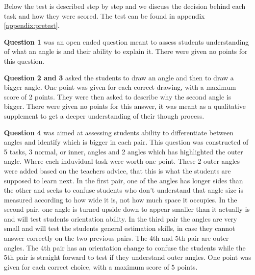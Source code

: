 
\bigskip\noindent
Below the test is described step by step and we discuss the decision behind each task and how they were scored. The test can be found in appendix \ref{appendix:pretest}.

\bigskip\noindent
\textbf{Question 1} was an open ended question meant to assess students understanding of what an angle is and their ability to explain it. There were given no points for this question.

\bigskip\noindent
\textbf{Question 2 and 3} asked the students to draw an angle and then to draw a bigger angle. 
One point was given for each correct drawing, with a maximum score of 2 points.
They were then asked to describe why the second angle is bigger. 
There were given no points for this answer, it was meant as a qualitative supplement to get a deeper understanding of their though process.

\bigskip\noindent
\textbf{Question 4} was aimed at assessing students ability to differentiate between angles and identify which is bigger in each pair. 
This question was constructed of 5 tasks, 3 normal, or inner, angles and 2 angles which has highlighted the outer angle. Where each induvidual task were worth one point. These 2 outer angles were added based on the teachers advice, that this is what the students are supposed to learn next. In the first pair, one of the angles has longer sides than the other and seeks to confuse students who don't understand that angle size is measured according to how wide it is, not how much space it occupies. In the second pair, one angle is turned upside down to appear smaller than it actually is and will test students orientation ability. In the third pair the angles are very small and will test the students general estimation skills, in case they cannot answer correctly on the two previous pairs. The 4th and 5th pair are outer angles. The 4th pair has an orientation change to confuse the students while the 5th pair is straight forward to test if they understand outer angles. One point was given for each correct choice, with a maximum score of 5 points.

